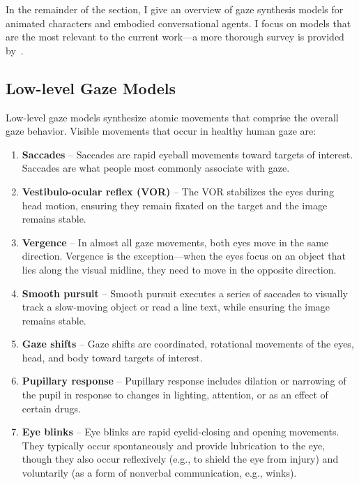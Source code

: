 In the remainder of the section, I give an overview of gaze synthesis models for animated characters and embodied conversational agents. I focus on models that are the most relevant to the current work---a more thorough survey is provided by~\citet{ruhland2015gazereview}.

\subsection{Low-level Gaze Models}

Low-level gaze models synthesize atomic movements that comprise the overall gaze behavior. Visible movements that occur in healthy human gaze are:

\begin{enumerate}
\item \textbf{Saccades} -- Saccades are rapid eyeball movements toward targets of interest. Saccades are what people most commonly associate with gaze.
\item \textbf{Vestibulo-ocular reflex (VOR)} -- The VOR stabilizes the eyes during head motion, ensuring they remain fixated on the target and the image remains stable.
\item \textbf{Vergence} -- In almost all gaze movements, both eyes move in the same direction. Vergence is the exception---when the eyes focus on an object that lies along the visual midline, they need to move in the opposite direction.
\item \textbf{Smooth pursuit} -- Smooth pursuit executes a series of saccades to visually track a slow-moving object or read a line text, while ensuring the image remains stable.
\item \textbf{Gaze shifts} -- Gaze shifts are coordinated, rotational movements of the eyes, head, and body toward targets of interest.
\item \textbf{Pupillary response} -- Pupillary response includes dilation or narrowing of the pupil in response to changes in lighting, attention, or as an effect of certain drugs.
\item \textbf{Eye blinks} -- Eye blinks are rapid eyelid-closing and opening movements. They typically occur spontaneously and provide lubrication to the eye, though they also occur reflexively (e.g., to shield the eye from injury) and voluntarily (as a form of nonverbal communication, e.g., winks).
\end{enumerate}

